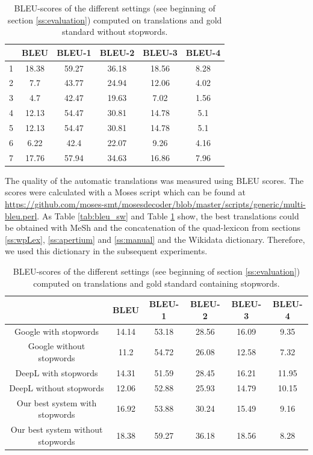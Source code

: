 \documentclass[a4paper,11pt]{article}
\begin{document}
\begin{table}[t]
	\begin{tabular}{c|c|c|c|c|c}
		&BLEU & BLEU-1 & BLEU-2 & BLEU-3 & BLEU-4\\
		\hline
		1 & 18.38 & 59.27 & 36.18 & 18.56 & 8.28\\
		2 & 7.7	& 43.77 & 24.94 & 12.06 & 4.02\\
		3 & 4.7	& 42.47 & 19.63 & 7.02 & 1.56\\
		4 & 12.13 &	54.47 & 30.81 & 14.78 & 5.1\\
		5 & 12.13 &	54.47 & 30.81 & 14.78 & 5.1\\
		6 & 6.22 & 42.4 & 22.07 & 9.26 & 4.16\\
		7 & 17.76 & 57.94 & 34.63 & 16.86 & 7.96\\
	\end{tabular}
	\caption{BLEU-scores of the different settings (see beginning of section \ref{ss:evaluation}) computed on translations and gold standard without stopwords.}
	\label{tab:bleu_without_sw}
\end{table}


The quality of the automatic translations was measured using BLEU scores. The scores were calculated with a Moses script which can be found at \url{https://github.com/moses-smt/mosesdecoder/blob/master/scripts/generic/multi-bleu.perl}.
As Table \ref{tab:bleu_sw} and Table \ref{tab:bleu_without_sw} show, the best translations could be obtained with MeSh and the concatenation of the quad-lexicon from sections \ref{ss:wpLex}, \ref{ss:apertium} and \ref{ss:manual} and the Wikidata dictionary. Therefore, we used this dictionary in the subsequent experiments.

\begin{table}[t]
	\begin{tabular}{c|c|c|c|c|c}
		&BLEU & BLEU-1 & BLEU-2 & BLEU-3 & BLEU-4\\
		\hline
		Google with stopwords & 14.14 &	53.18 & 28.56 & 16.09 & 9.35\\
		Google without stopwords & 11.2	& 54.72 & 26.08 & 12.58 & 7.32\\
		DeepL with stopwords & 14.31 & 51.59 & 28.45 & 16.21 & 11.95\\
		DeepL without stopwords & 12.06	& 52.88 & 25.93 & 14.79 & 10.15\\
		Our best system with stopwords & 16.92 & 53.88 & 30.24 & 15.49 & 9.16\\
		Our best system without stopwords & 18.38 & 59.27 & 36.18 & 18.56 & 8.28\\
	\end{tabular}
	\caption{BLEU-scores of the different settings (see beginning of section \ref{ss:evaluation}) computed on translations and gold standard containing stopwords.}
	\label{tab:Google_DeepL}
\end{table}
\end{document}
